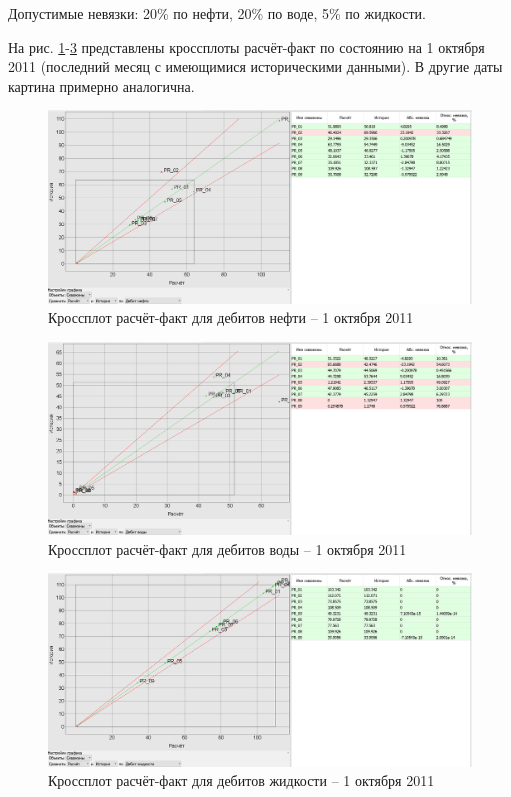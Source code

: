 \documentclass[a4paper,12pt]{article}
\begin{document}
Допустимые невязки: 20\% по нефти, 20\% по воде, 5\% по жидкости.

На рис. \ref{fig:krossplot_oil}-\ref{fig:krossplot_liquid} представлены кроссплоты расчёт-факт по состоянию на 1 октября 2011 (последний месяц с имеющимися историческими данными).
В другие даты картина примерно аналогична.

\begin{figure}[H]
\center
\includegraphics[width=\textwidth]{krossplot_oil}
\caption{Кроссплот расчёт-факт для дебитов нефти -- 1 октября 2011}
\label{fig:krossplot_oil}
\end{figure}

\begin{figure}[H]
\center
\includegraphics[width=\textwidth]{krossplot_water}
\caption{Кроссплот расчёт-факт для дебитов воды -- 1 октября 2011}
\label{fig:krossplot_water}
\end{figure}

\begin{figure}[H]
\center
\includegraphics[width=\textwidth]{krossplot_liquid}
\caption{Кроссплот расчёт-факт для дебитов жидкости -- 1 октября 2011}
\label{fig:krossplot_liquid}
\end{figure}
\end{document}
